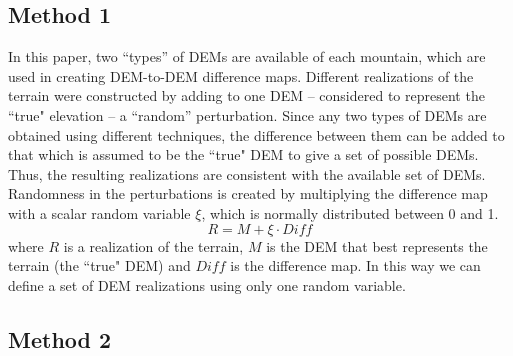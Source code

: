 \documentclass[12pt]{article}
\begin{document}
\subsection{Method 1} \label{Method1}
In this paper, two ``types'' of DEMs are available of each mountain,
which are used in creating DEM-to-DEM difference maps.  Different
realizations of the terrain were constructed by adding to one DEM --
considered to represent the ``true" elevation -- a ``random''
perturbation.  Since any two types of DEMs are obtained using
different techniques, the difference between them can be added to that
which is assumed to be the ``true" DEM to give a set of possible
DEMs. Thus, the resulting realizations are consistent with the
available set of DEMs. Randomness in the perturbations is created by
multiplying the difference map with a scalar random variable $\xi$, which is normally distributed between 0 and 1.
\begin{equation}
R = M + \xi \cdot Diff
\label{eq:two}
\end{equation}
where $R$ is a realization of the terrain, $M$ is the DEM that best
represents the terrain (the ``true" DEM) and $Diff$ is the difference map. 
In this way we can define a set
of DEM realizations using only one random variable.

\subsection{Method 2}
\label{Method2}

\end{document}
